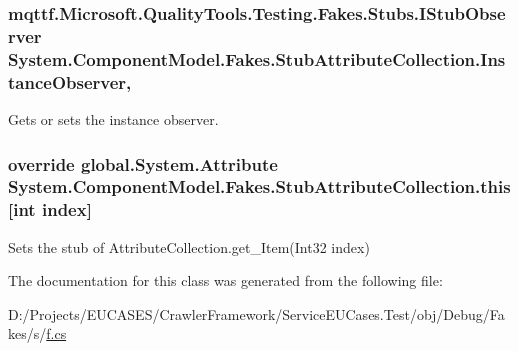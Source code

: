 \hypertarget{class_system_1_1_component_model_1_1_fakes_1_1_stub_attribute_collection_a0e77f0f447c86dcef3e2d9155d42e76f}{
\subsubsection[{Instance\-Observer}]{\setlength{\rightskip}{0pt plus 5cm}mqttf.\-Microsoft.\-Quality\-Tools.\-Testing.\-Fakes.\-Stubs.\-I\-Stub\-Observer System.\-Component\-Model.\-Fakes.\-Stub\-Attribute\-Collection.\-Instance\-Observer\hspace{0.3cm}{\ttfamily [get]}, {\ttfamily [set]}}}\label{class_system_1_1_component_model_1_1_fakes_1_1_stub_attribute_collection_a0e77f0f447c86dcef3e2d9155d42e76f}


Gets or sets the instance observer.

\hypertarget{class_system_1_1_component_model_1_1_fakes_1_1_stub_attribute_collection_a8378139fcac112afc534434a810cc856}{
\subsubsection[{this[int index]}]{\setlength{\rightskip}{0pt plus 5cm}override global.\-System.\-Attribute System.\-Component\-Model.\-Fakes.\-Stub\-Attribute\-Collection.\-this\mbox{[}int {\bf index}\mbox{]}\hspace{0.3cm}{\ttfamily [get]}}}\label{class_system_1_1_component_model_1_1_fakes_1_1_stub_attribute_collection_a8378139fcac112afc534434a810cc856}


Sets the stub of Attribute\-Collection.\-get\-\_\-\-Item(\-Int32 index)



The documentation for this class was generated from the following file\-:\begin{DoxyCompactItemize}
\item 
D\-:/\-Projects/\-E\-U\-C\-A\-S\-E\-S/\-Crawler\-Framework/\-Service\-E\-U\-Cases.\-Test/obj/\-Debug/\-Fakes/s/\hyperlink{s_2f_8cs}{f.\-cs}\end{DoxyCompactItemize}
